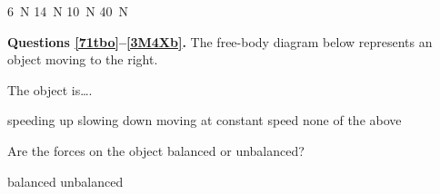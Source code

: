 \documentclass[]{exam}
\begin{document}
\begin{questions}
\begin{randomizeoneparchoices}
    \correctchoice \SI{6}{N}
    \choice \SI{14}{N}
    \choice \SI{10}{N}
    \choice \SI{40}{N}
\end{randomizeoneparchoices}


\begin{EnvUplevel}
    \textbf{Questions \ref{71tbo}--\ref{3M4Xb}.} The free-body diagram below represents an object moving to the right.
\end{EnvUplevel}


\begin{center}
\end{center}

\question \label{71tbo}
The object is\dots .

\begin{randomizeoneparchoices}
    \choice speeding up
    \correctchoice slowing down
    \choice moving at constant speed 
    \choice none of the above
\end{randomizeoneparchoices}

\question \label{3M4Xb}
Are the forces on the object balanced or unbalanced?

\begin{randomizeoneparchoices}[norandomize]
    \choice balanced
    \correctchoice unbalanced
\end{randomizeoneparchoices}


\clearpage

\ifprintanswers
    \printkeytable
\fi

\clearpage



\end{questions}

\clearpage
\end{document}
